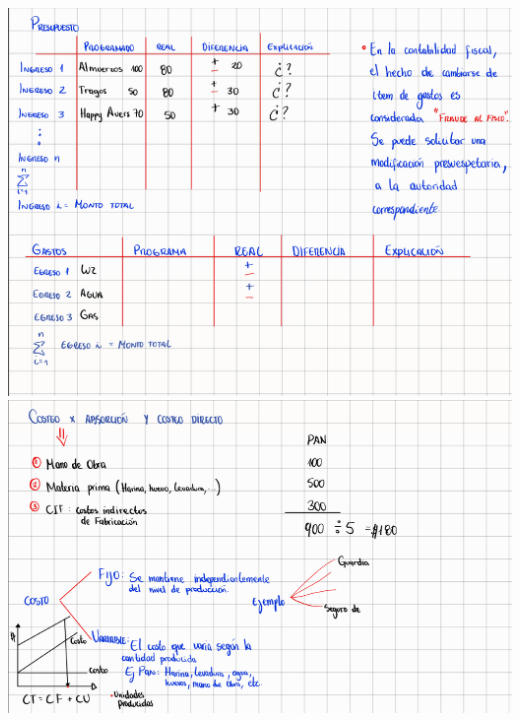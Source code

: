 \documentclass[letter,12pt]{article}
\begin{document}
		\includegraphics[scale=0.55]{figures/1}\\
		\includegraphics[scale=0.55]{figures/2}
\end{document}
